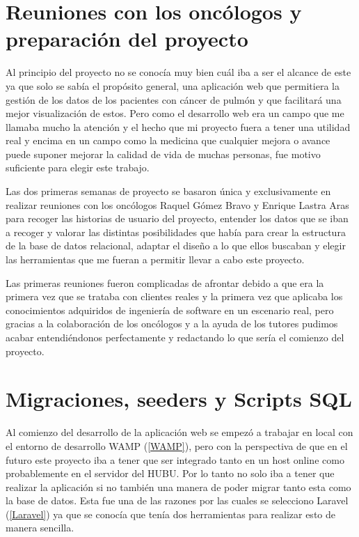 
\section{Reuniones con los oncólogos y preparación del proyecto}

Al principio del proyecto no se conocía muy bien cuál iba a ser el alcance de este ya que solo se sabía el propósito general, una aplicación web que permitiera la gestión de los datos de los pacientes con cáncer de pulmón y que facilitará una mejor visualización de estos. Pero como el desarrollo web era un campo que me llamaba mucho la atención y el hecho que mi proyecto fuera a tener una utilidad real y encima en un campo como la medicina que cualquier mejora o avance puede suponer mejorar la calidad de vida de muchas personas, fue motivo suficiente para elegir este trabajo.

Las dos primeras semanas de proyecto se basaron única y exclusivamente en realizar reuniones con los oncólogos Raquel Gómez Bravo y Enrique Lastra Aras para recoger las historias de usuario del proyecto, entender los datos que se iban a recoger y valorar las distintas posibilidades que había para crear la estructura de la base de datos relacional, adaptar el diseño a lo que ellos buscaban y elegir las herramientas que me fueran a permitir llevar a cabo este proyecto.

Las primeras reuniones fueron complicadas de afrontar debido a que era la primera vez que se trataba con clientes reales y la primera vez que aplicaba los conocimientos adquiridos de ingeniería de software en un escenario real, pero gracias a la colaboración de los oncólogos y a la ayuda de los tutores pudimos acabar entendiéndonos perfectamente y redactando lo que sería el comienzo del proyecto. 

\section{Migraciones, seeders y Scripts SQL}

Al comienzo del desarrollo de la aplicación web se empezó a trabajar en local con el entorno de desarrollo WAMP (\ref{WAMP}), pero con la perspectiva de que en el futuro este proyecto iba a tener que ser integrado tanto en un host online como probablemente en el servidor del HUBU. Por lo tanto no solo iba a tener que realizar la aplicación si no también una manera de poder migrar tanto esta como la base de datos. Esta fue una de las razones por las cuales se selecciono Laravel (\ref{Laravel}) ya que se conocía que tenía dos herramientas para realizar esto de manera sencilla.

